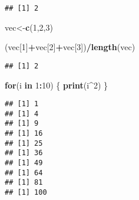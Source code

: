 \documentclass[
]{article}
\newenvironment{Shaded}{\begin{snugshade}}{\end{snugshade}}
\newcommand{\ControlFlowTok}[1]{\textcolor[rgb]{0.13,0.29,0.53}{\textbf{#1}}}
\newcommand{\DecValTok}[1]{\textcolor[rgb]{0.00,0.00,0.81}{#1}}
\newcommand{\FunctionTok}[1]{\textcolor[rgb]{0.13,0.29,0.53}{\textbf{#1}}}
\newcommand{\NormalTok}[1]{#1}
\newcommand{\OtherTok}[1]{\textcolor[rgb]{0.56,0.35,0.01}{#1}}
\newcommand{\SpecialCharTok}[1]{\textcolor[rgb]{0.81,0.36,0.00}{\textbf{#1}}}
\begin{document}
\begin{verbatim}
## [1] 2
\end{verbatim}

\begin{Shaded}
\begin{Highlighting}[]
\NormalTok{vec}\OtherTok{\textless{}{-}}\FunctionTok{c}\NormalTok{(}\DecValTok{1}\NormalTok{,}\DecValTok{2}\NormalTok{,}\DecValTok{3}\NormalTok{)}
\end{Highlighting}
\end{Shaded}

\begin{Shaded}
\begin{Highlighting}[]
\NormalTok{(vec[}\DecValTok{1}\NormalTok{]}\SpecialCharTok{+}\NormalTok{vec[}\DecValTok{2}\NormalTok{]}\SpecialCharTok{+}\NormalTok{vec[}\DecValTok{3}\NormalTok{])}\SpecialCharTok{/}\FunctionTok{length}\NormalTok{(vec)}
\end{Highlighting}
\end{Shaded}

\begin{verbatim}
## [1] 2
\end{verbatim}

\begin{Shaded}
\begin{Highlighting}[]
\ControlFlowTok{for}\NormalTok{(i }\ControlFlowTok{in} \DecValTok{1}\SpecialCharTok{:}\DecValTok{10}\NormalTok{)}
\NormalTok{\{}
  \FunctionTok{print}\NormalTok{(i}\SpecialCharTok{\^{}}\DecValTok{2}\NormalTok{)}
\NormalTok{\}}
\end{Highlighting}
\end{Shaded}

\begin{verbatim}
## [1] 1
## [1] 4
## [1] 9
## [1] 16
## [1] 25
## [1] 36
## [1] 49
## [1] 64
## [1] 81
## [1] 100
\end{verbatim}
\end{document}
